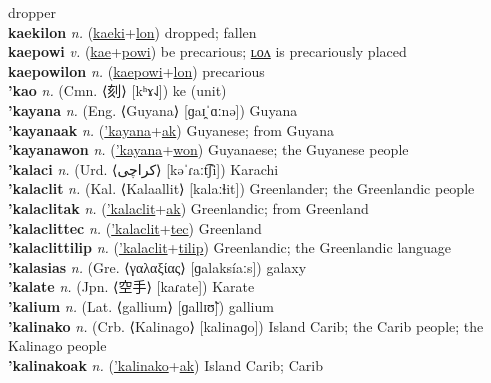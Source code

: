 dropper \label{kaekiles} \\
\textbf{kaekilon} \textit{n.} (\hyperref[kaeki]{kaeki}+\hyperref[lon]{lon})
dropped; fallen \label{kaekilon} \\
\textbf{kaepowi} \textit{v.} (\hyperref[kae]{kae}+\hyperref[powi]{powi})
be precarious; \hyperref[kaepowilon]{ʟᴏᴧ} is precariously placed \label{kaepowi} \\
\textbf{kaepowilon} \textit{n.} (\hyperref[kaepowi]{kaepowi}+\hyperref[lon]{lon})
precarious \label{kaepowilon} \\
\textbf{'kao} \textit{n.} (Cmn. ⟨刻⟩ [kʰɤ˨˩])
ke (unit) \label{'kao} \\
\textbf{'kayana} \textit{n.} (Eng. ⟨Guyana⟩ [ɡaɪ̯ˈɑːnə])
Guyana \label{'kayana} \\
\textbf{'kayanaak} \textit{n.} (\hyperref['kayana]{'kayana}+\hyperref[ak]{ak})
Guyanese; from Guyana \label{'kayanaak} \\
\textbf{'kayanawon} \textit{n.} (\hyperref['kayana]{'kayana}+\hyperref[won]{won})
Guyanaese; the Guyanese people \label{'kayanawon} \\
\textbf{'kalaci} \textit{n.} (Urd. ⟨کراچی‎⟩ [kəˈɾaːt͡ʃi])
Karachi \label{'kalaci} \\
\textbf{'kalaclit} \textit{n.} (Kal. ⟨Kalaallit⟩ [kalaːɬit])
Greenlander; the Greenlandic people \label{'kalaclit} \\
\textbf{'kalaclitak} \textit{n.} (\hyperref['kalaclit]{'kalaclit}+\hyperref[ak]{ak})
Greenlandic; from Greenland \label{'kalaclitak} \\
\textbf{'kalaclittec} \textit{n.} (\hyperref['kalaclit]{'kalaclit}+\hyperref[tec]{tec})
Greenland \label{'kalaclittec} \\
\textbf{'kalaclittilip} \textit{n.} (\hyperref['kalaclit]{'kalaclit}+\hyperref[tilip]{tilip})
Greenlandic; the Greenlandic language \label{'kalaclittilip} \\
\textbf{'kalasias} \textit{n.} (Gre. ⟨γαλαξίας⟩ [ɡalaksíaːs])
galaxy \label{'kalasias} \\
\textbf{'kalate} \textit{n.} (Jpn. ⟨空手⟩ [kaɾate])
Karate \label{'kalate} \\
\textbf{'kalium} \textit{n.} (Lat. ⟨gallium⟩ [ɡallɪʊ̃])
gallium \label{'kalium} \\
\textbf{'kalinako} \textit{n.} (Crb. ⟨Kalinago⟩ [kalinaɡo])
Island Carib; the Carib people; the Kalinago people \label{'kalinako} \\
\textbf{'kalinakoak} \textit{n.} (\hyperref['kalinako]{'kalinako}+\hyperref[ak]{ak})
Island Carib; Carib \label{'kalinakoak} \\
